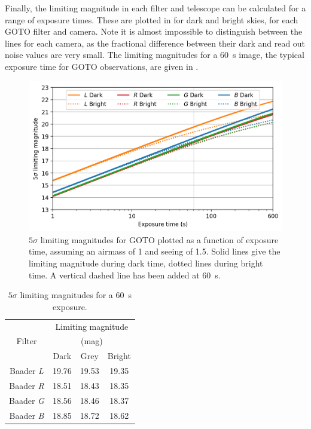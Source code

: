 \begin{colsection}
\begin{colsection}
Finally, the limiting magnitude in each filter and telescope can be calculated for a range of exposure times. These are plotted in  for dark and bright skies, for each GOTO filter and camera. Note it is almost impossible to distinguish between the lines for each camera, as the fractional difference between their dark and read out noise values are very small. The limiting magnitudes for a \SI{60}{\second} image, the typical exposure time for GOTO observations, are given in .

\begin{figure}[t]
    \begin{center}
        \includegraphics[width=\textwidth]{images/throughput/limiting_mag.png}
    \end{center}
    \caption[$5\sigma$ limiting magnitudes for GOTO]{
        $5\sigma$ limiting magnitudes for GOTO plotted as a function of exposure time, assuming an airmass of 1 and seeing of 1.5. Solid lines give the limiting magnitude during dark time, dotted lines during bright time. A vertical dashed line has been added at \SI{60}{\second}.
    }\label{fig:lim_mags}
\end{figure}

\begin{table}[t]
    \begin{center}
        \begin{tabular}{c|ccc} %
                   & \multicolumn{3}{c}{Limiting magnitude} \\
            Filter & \multicolumn{3}{c}{(mag)} \\
                   & Dark & Grey & Bright \\
            \midrule
            Baader \textit{L} & 19.76 & 19.53 & 19.35 \\
            Baader \textit{R} & 18.51 & 18.43 & 18.35 \\
            Baader \textit{G} & 18.56 & 18.46 & 18.37 \\
            Baader \textit{B} & 18.85 & 18.72 & 18.62 \\
        \end{tabular}
    \end{center}
    \caption[$5\sigma$ limiting magnitudes for a \SI{60}{\second} exposure]{
        $5\sigma$ limiting magnitudes for a \SI{60}{\second} exposure.
    }\label{tab:lim_mags}
\end{table}


\end{colsection}
\end{colsection}
